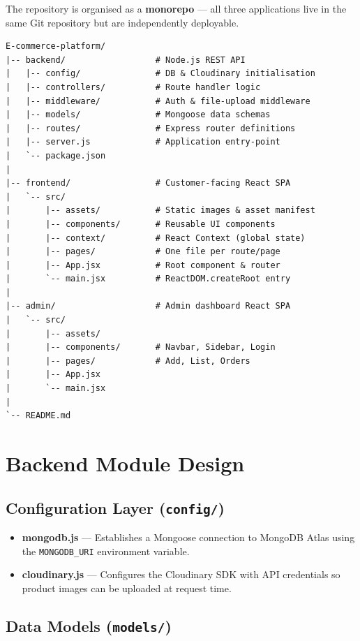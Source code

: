 \documentclass[12pt,a4paper]{report}
\begin{document}
The repository is organised as a \textbf{monorepo} — all three applications live in the same Git
repository but are independently deployable.

\begin{lstlisting}[caption={Top-level folder structure}, label=lst:folders, language={}]
E-commerce-platform/
|-- backend/                  # Node.js REST API
|   |-- config/               # DB & Cloudinary initialisation
|   |-- controllers/          # Route handler logic
|   |-- middleware/           # Auth & file-upload middleware
|   |-- models/               # Mongoose data schemas
|   |-- routes/               # Express router definitions
|   |-- server.js             # Application entry-point
|   `-- package.json
|
|-- frontend/                 # Customer-facing React SPA
|   `-- src/
|       |-- assets/           # Static images & asset manifest
|       |-- components/       # Reusable UI components
|       |-- context/          # React Context (global state)
|       |-- pages/            # One file per route/page
|       |-- App.jsx           # Root component & router
|       `-- main.jsx          # ReactDOM.createRoot entry
|
|-- admin/                    # Admin dashboard React SPA
|   `-- src/
|       |-- assets/
|       |-- components/       # Navbar, Sidebar, Login
|       |-- pages/            # Add, List, Orders
|       |-- App.jsx
|       `-- main.jsx
|
`-- README.md
\end{lstlisting}

\section{Backend Module Design}

\subsection{Configuration Layer (\texttt{config/})}

\begin{itemize}[leftmargin=*]
  \item \textbf{mongodb.js} — Establishes a Mongoose connection to MongoDB Atlas using the
        \texttt{MONGODB\_URI} environment variable.
  \item \textbf{cloudinary.js} — Configures the Cloudinary SDK with API credentials so product
        images can be uploaded at request time.
\end{itemize}

\subsection{Data Models (\texttt{models/})}
\end{document}
